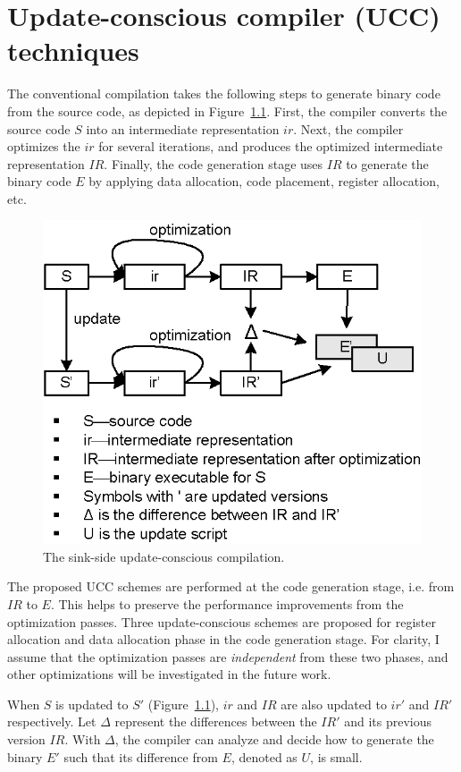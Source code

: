 \chapter{ Update-conscious compiler (UCC) techniques}

The conventional compilation takes the following steps to generate binary code from the source code, as depicted in
Figure~\ref{fover.sink}. First, the compiler converts the source code $S$ into an intermediate representation $ir$. 
Next, the compiler optimizes the $ir$ for several iterations, and produces the optimized intermediate representation 
$IR$. Finally, the code generation stage uses $IR$ to generate the binary code $E$ by applying data allocation, code 
placement, register allocation, etc.
\begin{figure}[htp]
\centering
\includegraphics[scale=1]{figures/com_sink.eps}
\caption{The sink-side update-conscious compilation.}
\label{fover.sink}
\end{figure}

The proposed UCC schemes are performed at the code generation stage, i.e. from $IR$ to $E$. This helps to preserve the 
performance improvements from the optimization passes. 
Three update-conscious schemes are proposed for register allocation and data allocation phase in the code generation 
stage. For clarity, I assume that the optimization passes are {\it independent} from these two phases, and other 
optimizations will be investigated in the future work.

When $S$ is updated to $S'$ (Figure~\ref{fover.sink}), $ir$ and $IR$ are also updated to $ir'$ and $IR'$ respectively. 
Let $\Delta$ represent the differences between the $IR'$ and its previous version $IR$. With $\Delta$, the compiler can 
analyze and decide how to generate the binary $E'$ such that its difference from $E$, denoted as $U$, is small.

